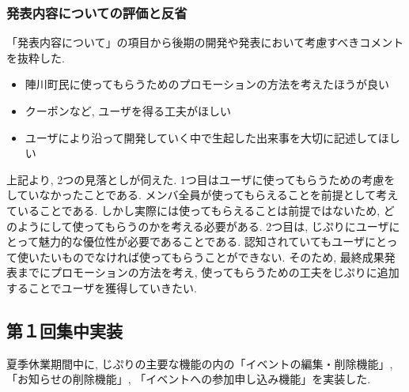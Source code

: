 \subsubsection{発表内容についての評価と反省}
「発表内容について」の項目から後期の開発や発表において考慮すべきコメントを抜粋した.
\begin{itemize}
  \item 陣川町民に使ってもらうためのプロモーションの方法を考えたほうが良い
  \item クーポンなど, ユーザを得る工夫がほしい
  \item ユーザにより沿って開発していく中で生起した出来事を大切に記述してほしい
\end{itemize}
    上記より, 2つの見落としが伺えた. 1つ目はユーザに使ってもらうための考慮をしていなかったことである.
    メンバ全員が使ってもらえることを前提として考えていることである. しかし実際には使ってもらえることは前提ではないため,
    どのようにして使ってもらうのかを考える必要がある. 2つ目は, じぷりにユーザにとって魅力的な優位性が必要であることである.
    認知されていてもユーザにとって使いたいものでなければ使ってもらうことができない. そのため, 最終成果発表までにプロモーションの方法を考え,
    使ってもらうための工夫をじぷりに追加することでユーザを獲得していきたい.


\subsection{第１回集中実装}
夏季休業期間中に, じぷりの主要な機能の内の「イベントの編集・削除機能」, 「お知らせの削除機能」, 「イベントへの参加申し込み機能」を実装した.


